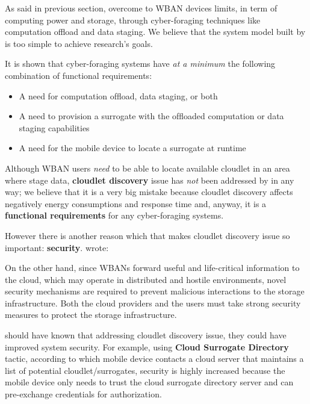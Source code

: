 \documentclass[sigchi]{acmart}
\begin{document}
As said in previous section, \citet{MSAReport} overcome to WBAN devices limits, in term of computing power and storage, through cyber-foraging techniques like computation offload and data staging. We believe that the system model built by \citet{MSAReport} is too simple to achieve research's goals.

It is shown \cite{DecisionModel} that cyber-foraging systems have \textit{at a minimum} the following combination of functional requirements:

\begin{itemize}

\item  A need for computation ofﬂoad, data staging, or both
\item  A need to provision a surrogate with the ofﬂoaded computation or data staging capabilities
\item  A need for the mobile device to locate a surrogate at runtime

\end{itemize}

Although WBAN users \textit{need} to be able to locate available cloudlet in an area where stage data, \textbf{cloudlet discovery} issue has \textit{not} been addressed by \citet{MSAReport} in any way; we believe that it is a very big mistake because cloudlet discovery affects negatively energy consumptions and response time and, anyway, it is a \textbf{functional requirements} for any cyber-foraging systems. 

However there is another reason which that makes cloudlet discovery issue so important: \textbf{security}. \citep{MSAReport} wrote:

\vspace{0.3cm}

\begin{quoting}[font=itshape, begintext={``}, endtext={''\cite[par.~3.3]{MSAReport}}]
On the other hand, since WBANs forward useful and life-critical information to the cloud, which may operate in distributed and hostile environments, novel security mechanisms are required to prevent malicious interactions to the storage infrastructure. Both the cloud providers and the users must take strong security measures to protect the storage infrastructure.
\end{quoting}

\vspace{0.3cm}

\citet{MSAReport} should have known that addressing cloudlet discovery issue, they could have improved system security. For example, using \textbf{Cloud Surrogate Directory} tactic, according to which mobile device contacts a cloud server that maintains a list of potential cloudlet/surrogates, security is highly increased because the mobile device only needs to trust the cloud surrogate directory server and can pre-exchange credentials for authorization. 
\end{document}
